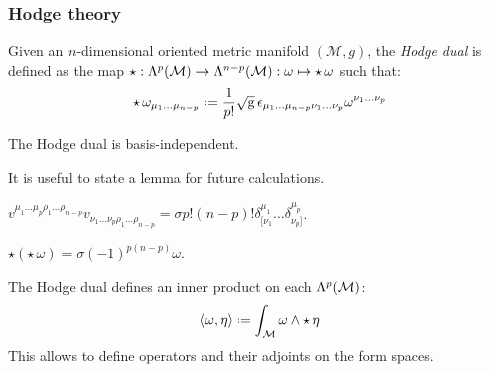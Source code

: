 \subsubsection{Hodge theory}

\begin{definition}
  Given an $ n $-dimensional oriented metric manifold $ (\mathcal{M},g) $, the \textit{Hodge dual} is defined as the map $ \star : \Lambda^{p}(\mathcal{M}) \rightarrow \Lambda^{n-p}(\mathcal{M}) : \omega \mapsto \star\, \omega $ such that:
  \begin{equation}
    \star\, \omega_{\mu_1 \dots \mu_{n-p}} \defeq \frac{1}{p!} \sqg\, \epsilon_{\mu_1 \dots \mu_{n-p} \nu_1 \dots \nu_p} \omega^{\nu_1 \dots \nu_p}
    \label{eq:3.17}
  \end{equation}
\end{definition}

\begin{proposition}
  The Hodge dual is basis-independent.
\end{proposition}

It is useful to state a lemma for future calculations.

\begin{lemma}
  $ v^{\mu_1 \dots \mu_p \rho_1 \dots \rho_{n-p}} v_{\nu_1 \dots \nu_p \rho_1 \dots \rho_{n-p}} = \sigma p! (n-p)! \delta^{\mu_1}_{[\nu_1} \dots \delta^{\mu_p}_{\nu_p]} $.
\end{lemma}

\begin{proposition}\label{hodge-hodge}
  $ \star \left( \star\, \omega \right) = \sigma \left( -1 \right)^{p (n-p)} \omega $.
\end{proposition}

The Hodge dual defines an inner product on each $ \Lambda^{p}(\mathcal{M}) $:
\begin{equation}
  \braket{\omega, \eta} \defeq \int_{\mathcal{M}} \omega \wedge \star\, \eta
  \label{eq:3.18}
\end{equation}
This allows to define operators and their adjoints on the form spaces.

